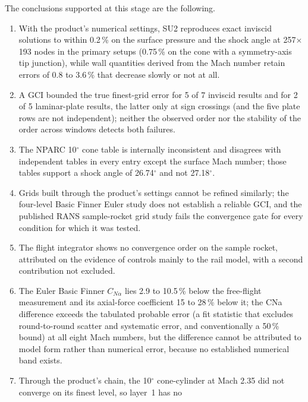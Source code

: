 \documentclass[11pt,a4paper]{article}
\newcommand{\CNa}{C_{N\alpha}}
\begin{document}
The conclusions supported at this stage are the following.
\begin{enumerate}
\item With the product's numerical settings, SU2 reproduces exact inviscid solutions to within 0.2\,\% on the surface
  pressure and the shock angle at 257$\times$193 nodes in the primary setups (0.75\,\% on the cone with a symmetry-axis tip
  junction), while wall quantities derived from the Mach number retain errors of 0.8 to 3.6\,\% that decrease slowly or not
  at all.
\item A GCI bounded the true finest-grid error for 5 of 7 inviscid results and for 2 of 5 laminar-plate results, the latter only at
  sign crossings (and the five plate rows are not independent); neither the observed order nor the stability of the order across windows
  detects both failures.
\item The NPARC 10$^\circ$ cone table is internally inconsistent and disagrees with independent tables in every entry except
  the surface Mach number; those tables support a shock angle of 26.74$^\circ$ and not 27.18$^\circ$.
\item Grids built through the product's settings cannot be refined similarly; the four-level Basic Finner Euler study
  does not establish a reliable GCI, and the published RANS sample-rocket grid study fails the convergence gate for every
  condition for which it was tested.
\item The flight integrator shows no convergence order on the sample rocket, attributed on the evidence of controls
  mainly to the rail model, with a second contribution not excluded.
\item The Euler Basic Finner $\CNa$ lies 2.9 to 10.5\,\% below the free-flight measurement and its axial-force coefficient
  15 to 28\,\% below it; the CNa difference exceeds the tabulated probable error (a fit statistic that excludes round-to-round scatter and systematic error, and conventionally a 50\,\% bound) at all eight Mach numbers, but the difference
  cannot be attributed to model form rather than numerical error, because no established numerical band exists.
\item Through the product's chain, the 10$^\circ$ cone-cylinder at Mach 2.35 did not converge on its finest level, so layer~1 has no

\end{enumerate}
\end{document}
